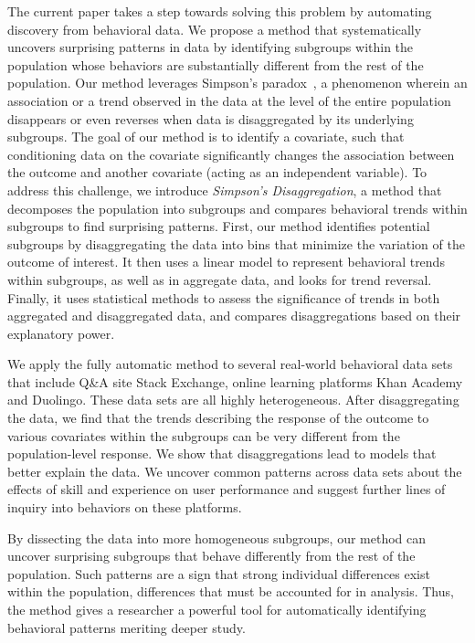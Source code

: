 \documentclass[letterpaper]{article} %
\begin{document}
The current paper takes a step towards solving this problem by automating discovery from behavioral data. We propose a method that systematically uncovers surprising patterns in data by identifying subgroups within the population whose behaviors are substantially different from the rest of the population.
Our method leverages Simpson's paradox~\cite{Blyth1972,Norton2015simpson}, a phenomenon wherein an association or a trend observed in the data at the level of the entire population disappears or even reverses when data is disaggregated by its underlying subgroups. %
The goal of our method is to identify a covariate, such that conditioning data on the covariate significantly changes the association between the outcome and another covariate (acting as an independent variable).
To address this challenge, we introduce \emph{Simpson's Disaggregation}, a method that decomposes the population into subgroups and compares behavioral trends within subgroups to find surprising patterns. First, our method identifies potential subgroups by disaggregating the data into bins that minimize the variation of the outcome of interest. It then uses a linear model to represent behavioral trends within subgroups, as well as in aggregate data, and looks for trend reversal.
Finally, it uses statistical methods to assess the significance of trends in both aggregated and disaggregated data, and compares disaggregations based on their explanatory power.

We apply the fully automatic method to several real-world behavioral data sets that include Q\&A site Stack Exchange, online learning platforms Khan Academy and Duolingo. These data sets are all highly heterogeneous. After disaggregating the data, we find that the trends describing the response of the outcome to various covariates within the subgroups can be very different from the population-level response. We show that disaggregations lead to models that better explain the data.   We uncover common patterns across data sets about the effects of skill and experience on user performance and suggest further lines of inquiry into behaviors on these platforms.


By dissecting the data into more homogeneous subgroups, our method can uncover surprising subgroups that behave differently from the rest of the population. Such patterns are a sign that strong individual differences exist within the population, differences that must be accounted for in analysis. Thus, the method gives a researcher a powerful tool for automatically identifying behavioral patterns meriting deeper study.
\end{document}
